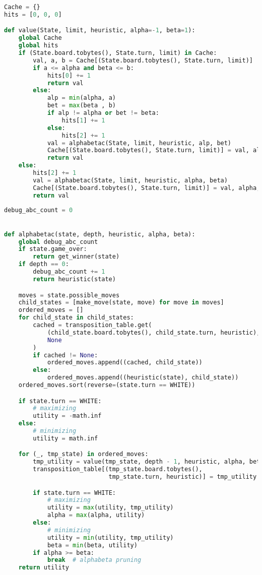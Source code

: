 \begin{lstlisting}[language=Python]
Cache = {}
hits = [0, 0, 0]

def value(State, limit, heuristic, alpha=-1, beta=1):
    global Cache
    global hits
    if (State.board.tobytes(), State.turn, limit) in Cache:
        val, a, b = Cache[(State.board.tobytes(), State.turn, limit)]
        if a <= alpha and beta <= b:
            hits[0] += 1
            return val
        else:
            alp = min(alpha, a)
            bet = max(beta , b)
            if alp != alpha or bet != beta:
                hits[1] += 1
            else:
                hits[2] += 1
            val = alphabetac(State, limit, heuristic, alp, bet)
            Cache[(State.board.tobytes(), State.turn, limit)] = val, alp, bet
            return val
    else:
        hits[2] += 1
        val = alphabetac(State, limit, heuristic, alpha, beta)
        Cache[(State.board.tobytes(), State.turn, limit)] = val, alpha, beta
        return val
\end{lstlisting}

\begin{lstlisting}[language=Python]
debug_abc_count = 0


def alphabetac(state, depth, heuristic, alpha, beta):
    global debug_abc_count
    if state.game_over:
        return get_winner(state)
    if depth == 0:
        debug_abc_count += 1
        return heuristic(state)

    moves = state.possible_moves
    child_states = [make_move(state, move) for move in moves]
    ordered_moves = []
    for child_state in child_states:
        cached = transposition_table.get(
            (child_state.board.tobytes(), child_state.turn, heuristic),
            None
        )
        if cached != None:
            ordered_moves.append((cached, child_state))
        else:
            ordered_moves.append((heuristic(state), child_state))
    ordered_moves.sort(reverse=(state.turn == WHITE))

    if state.turn == WHITE:
        # maximizing
        utility = -math.inf
    else:
        # minimizing
        utility = math.inf

    for (_, tmp_state) in ordered_moves:
        tmp_utility = value(tmp_state, depth - 1, heuristic, alpha, beta)
        transposition_table[(tmp_state.board.tobytes(),
                             tmp_state.turn, heuristic)] = tmp_utility

        if state.turn == WHITE:
            # maximizing
            utility = max(utility, tmp_utility)
            alpha = max(alpha, utility)
        else:
            # minimizing
            utility = min(utility, tmp_utility)
            beta = min(beta, utility)
        if alpha >= beta:
            break  # alphabeta pruning
    return utility
\end{lstlisting}

